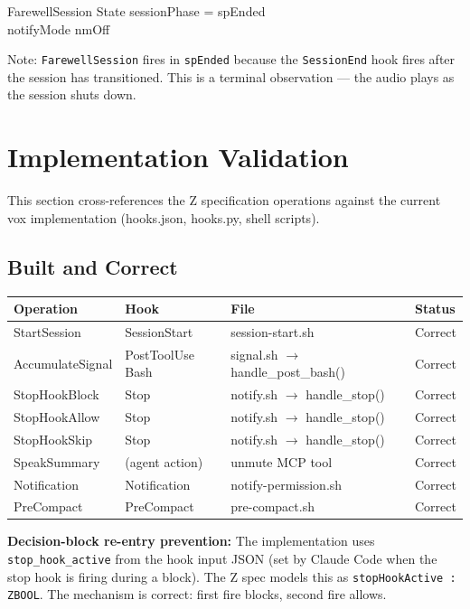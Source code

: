 \documentclass[a4paper,10pt,fleqn]{article}
\begin{document}
\begin{schema}{FarewellSession}
  \Xi State
  \where
  sessionPhase = spEnded \\
  notifyMode \neq nmOff
\end{schema}

Note: \texttt{FarewellSession} fires in \texttt{spEnded} because the
\texttt{SessionEnd} hook fires after the session has transitioned.
This is a terminal observation --- the audio plays as the session
shuts down.

\section{Implementation Validation}

This section cross-references the Z specification operations against
the current vox implementation (hooks.json, hooks.py, shell scripts).

\subsection{Built and Correct}

\begin{tabular}{llll}
\hline
\textbf{Operation} & \textbf{Hook} & \textbf{File} & \textbf{Status} \\
\hline
StartSession & SessionStart & session-start.sh & Correct \\
AccumulateSignal & PostToolUse Bash & signal.sh $\to$ handle\_post\_bash() & Correct \\
StopHookBlock & Stop & notify.sh $\to$ handle\_stop() & Correct \\
StopHookAllow & Stop & notify.sh $\to$ handle\_stop() & Correct \\
StopHookSkip & Stop & notify.sh $\to$ handle\_stop() & Correct \\
SpeakSummary & (agent action) & unmute MCP tool & Correct \\
Notification & Notification & notify-permission.sh & Correct \\
PreCompact & PreCompact & pre-compact.sh & Correct \\
\hline
\end{tabular}

\textbf{Decision-block re-entry prevention:} The implementation uses
\texttt{stop\_hook\_active} from the hook input JSON (set by Claude Code
when the stop hook is firing during a block). The Z spec models this as
\texttt{stopHookActive : ZBOOL}. The mechanism is correct: first fire
blocks, second fire allows.
\end{document}
